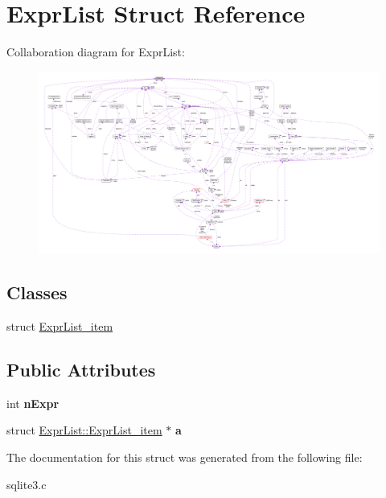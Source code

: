 \hypertarget{structExprList}{}\section{Expr\+List Struct Reference}
\label{structExprList}


Collaboration diagram for Expr\+List\+:\nopagebreak
\begin{figure}[H]
\begin{center}
\leavevmode
\includegraphics[width=350pt]{structExprList__coll__graph}
\end{center}
\end{figure}
\subsection*{Classes}
\begin{DoxyCompactItemize}
\item 
struct \hyperlink{structExprList_1_1ExprList__item}{Expr\+List\+\_\+item}
\end{DoxyCompactItemize}
\subsection*{Public Attributes}
\begin{DoxyCompactItemize}
\item 
int {\bfseries n\+Expr}\hypertarget{structExprList_a88bdbd62cce306124eea63ae9f80ec33}{}\label{structExprList_a88bdbd62cce306124eea63ae9f80ec33}

\item 
struct \hyperlink{structExprList_1_1ExprList__item}{Expr\+List\+::\+Expr\+List\+\_\+item} $\ast$ {\bfseries a}\hypertarget{structExprList_a02a4222d2dc4da64dcec416188abc16c}{}\label{structExprList_a02a4222d2dc4da64dcec416188abc16c}

\end{DoxyCompactItemize}


The documentation for this struct was generated from the following file\+:\begin{DoxyCompactItemize}
\item 
sqlite3.\+c\end{DoxyCompactItemize}
